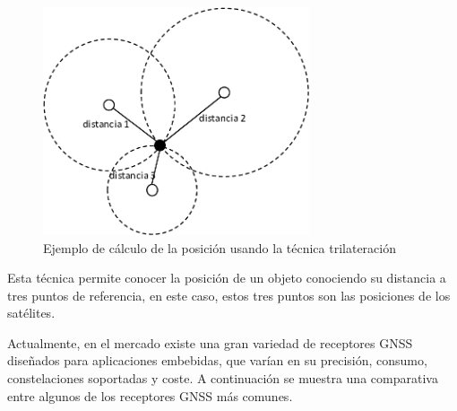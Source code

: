 \begin{itemize}
    \begin{figure}[h]
        \centering
        \includegraphics[width=0.7\textwidth]{Imagenes/Bitmap/trilateracion}
        \caption{Ejemplo de cálculo de la posición usando la técnica trilateración}
        \label{fig:trilateracion}
    \end{figure}

    Esta técnica permite conocer la posición de un objeto conociendo su distancia a tres puntos de referencia,
    en este caso, estos tres puntos son las posiciones de los satélites.

    Actualmente, en el mercado existe una gran variedad de receptores GNSS diseñados para aplicaciones embebidas, que varían en su precisión, consumo, constelaciones soportadas y coste.
    A continuación se muestra una comparativa entre algunos de los receptores GNSS más comunes.
    \begin{table}[h]
        \centering
        \footnotesize
        \caption{Comparativa de receptores GNSS comunes en sistemas embebidos}
        \label{tab:gnss_modules}
    \end{table}


\end{itemize}


